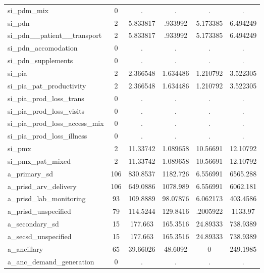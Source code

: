\begin{table}[htbp]
\begin{tabular}{l*{1}{ccccc}}
si\_pdm\_mix  &           0&           .&           .&           .&           .\\
si\_pdn      &           2&    5.833817&     .933992&    5.173385&    6.494249\\
si\_pdn\_\_patient\_\_transport&           2&    5.833817&     .933992&    5.173385&    6.494249\\
si\_pdn\_accomodation&           0&           .&           .&           .&           .\\
si\_pdn\_supplements&           0&           .&           .&           .&           .\\
si\_pia      &           2&    2.366548&    1.634486&    1.210792&    3.522305\\
si\_pia\_pat\_productivity&           2&    2.366548&    1.634486&    1.210792&    3.522305\\
si\_pia\_prod\_loss\_trans&           0&           .&           .&           .&           .\\
si\_pia\_prod\_loss\_visits&           0&           .&           .&           .&           .\\
si\_pia\_prod\_loss\_access\_mix&           0&           .&           .&           .&           .\\
si\_pia\_prod\_loss\_illness&           0&           .&           .&           .&           .\\
si\_pmx      &           2&    11.33742&    1.089658&    10.56691&    12.10792\\
si\_pmx\_pat\_mixed&           2&    11.33742&    1.089658&    10.56691&    12.10792\\
a\_primary\_sd&         106&    830.8537&    1182.726&    6.556991&    6565.288\\
a\_prisd\_arv\_delivery&         106&    649.0886&    1078.989&    6.556991&    6062.181\\
a\_prisd\_lab\_monitoring&          93&    109.8889&    98.07876&    6.062173&    403.4586\\
a\_prisd\_unspecified&          79&    114.5244&    129.8416&    .2005922&     1133.97\\
a\_secondary\_sd&          15&     177.663&    165.3516&    24.89333&    738.9389\\
a\_secsd\_unspecified&          15&     177.663&    165.3516&    24.89333&    738.9389\\
a\_ancillary &          65&    39.66026&     48.6092&           0&    249.1985\\
a\_anc\_demand\_generation&           0&           .&           .&           .&           .\\

\end{tabular}
\end{table}
